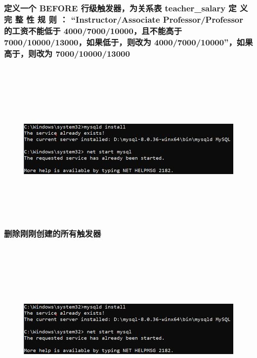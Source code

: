 \documentclass{ctexart}
\begin{document}
\subsubsection{定义一个 BEFORE 行级触发器，为关系表 teacher\_salary 定 义 完 整 性 规 则 ：
“Instructor/Associate Professor/Professor 的工资不能低于 4000/7000/10000，且不能高于
7000/10000/13000，如果低于，则改为 4000/7000/10000”，如果高于，则改为 7000/10000/13000}
\begin{lstlisting}[language=sql]
	
\end{lstlisting}
\begin{figure}[H]
	\centering 
	\includegraphics[height=7cm,width=14cm]{1.png}
	\end{figure}
\subsubsection{删除刚刚创建的所有触发器}
\begin{lstlisting}[language=sql]
	
\end{lstlisting}
\begin{figure}[H]
	\centering 
	\includegraphics[height=7cm,width=14cm]{1.png}
	\end{figure}
\end{document}

